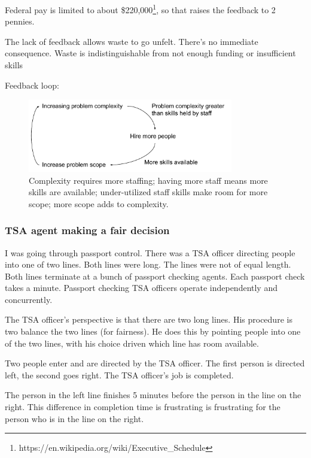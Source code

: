 Federal pay is limited to about \$220,000\footnote{https://en.wikipedia.org/wiki/Executive\_Schedule}, so that raises the feedback to 2 pennies.

The lack of feedback allows waste to go unfelt. There's no immediate consequence.
Waste is indistinguishable from not enough funding or insufficient skills 




Feedback loop:
\begin{center}
\begin{figure}[ht]
    \centering
    \includegraphics[width=0.8\textwidth]{images/feedback_loop_complexity_and_staffing}
    \caption{Complexity requires more staffing; having more staff means more skills are available; under-utilized staff skills make room for more scope; more scope adds to complexity.}
    \label{fig:complexity_and_staff_growth}
\end{figure}
\end{center}

\subsubsection{TSA agent making a fair decision}
I was going through passport control. There was a TSA officer directing people into one of two lines. Both lines were long. The lines were not of equal length. Both lines terminate at a bunch of passport checking agents. Each passport check takes a minute. Passport checking TSA officers operate independently and concurrently.


The TSA officer's perspective is that there are two long lines. His procedure is two balance the two lines (for fairness). He does this by pointing people into one of the two lines, with his choice driven which line has room available.

Two people enter and are directed by the TSA officer. The first person is directed left, the second goes right. The TSA officer's job is completed.

The person in the left line finishes 5 minutes before the person in the line on the right. This difference in completion time is frustrating is frustrating for the person who is in the line on the right.

